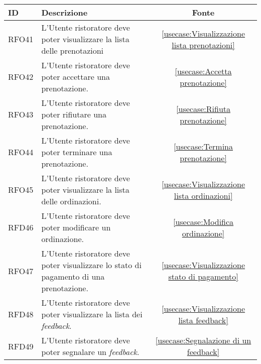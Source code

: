\begin{table}[H]
	\renewcommand{\arraystretch}{1.5}
	\centering
	\begin{tabularx}{\textwidth}{l|X|c}
		\textbf{ID} & \textbf{Descrizione}                                                                                                    & \textbf{Fonte}                                                       \\
		\hline
		RFO41       & L'Utente ristoratore deve poter visualizzare la lista delle prenotazioni												  & \autoref{usecase:Visualizzazione lista prenotazioni}                 \\
		\hline
		RFO42       & L'Utente ristoratore deve poter accettare una prenotazione.                                                             & \autoref{usecase:Accetta prenotazione}                               \\
		\hline
		RFO43       & L'Utente ristoratore deve poter rifiutare una prenotazione.                                                             & \autoref{usecase:Rifiuta prenotazione}                               \\
		\hline
		RFO44       & L'Utente ristoratore deve poter terminare una prenotazione.                                                             & \autoref{usecase:Termina prenotazione}                               \\
		\hline
		RFO45       & L'Utente ristoratore deve poter visualizzare la lista delle ordinazioni.                                                & \autoref{usecase:Visualizzazione lista ordinazioni}                  \\
		\hline
		RFD46       & L'Utente ristoratore deve poter modificare un ordinazione.                                                              & \autoref{usecase:Modifica ordinazione}                               \\
		\hline
		RFO47       & L'Utente ristoratore deve poter visualizzare lo stato di pagamento di una prenotazione.                                 & \autoref{usecase:Visualizzazione stato di pagamento}                 \\
		\hline
		RFD48       & L'Utente ristoratore deve poter visualizzare la lista dei \textit{feedback}.                                            & \autoref{usecase:Visualizzazione lista feedback}                     \\
		\hline
		RFD49       & L'Utente ristoratore deve poter segnalare un \textit{feedback}.                                                         & \autoref{usecase:Segnalazione di un feedback}                        \\

\end{tabularx}
\end{table}
